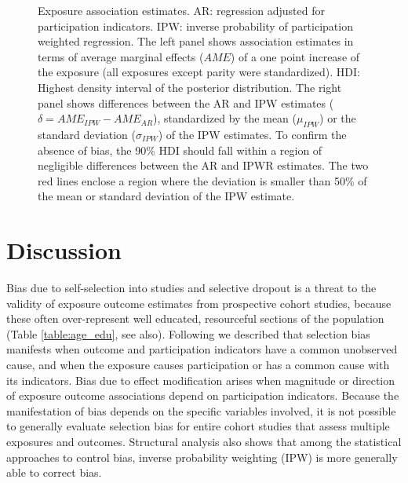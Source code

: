\documentclass[]{article}
\begin{document}
\begin{figure}
	\centering
	
	\caption{\footnotesize \linespread{1.3}\selectfont{} Exposure association estimates. AR: regression adjusted for participation indicators. IPW: inverse probability of participation weighted regression. The left panel shows association estimates in terms of average marginal effects ($AME$) of a one point increase of the exposure (all exposures except parity were standardized). HDI: Highest density interval of the posterior distribution. The right panel shows differences between the AR and IPW estimates ($\delta = AME_{IPW}-AME_{AR}$), standardized by the mean ($\mu_{IPW}$) or the standard deviation ($\sigma_{IPW}$) of the IPW estimates. To confirm the absence of bias, the 90\% HDI should fall within a region of negligible differences between the AR and IPWR estimates. The two red lines enclose a region where the deviation is smaller than 50\% of the mean or standard deviation of the IPW estimate.}
	\label{fig:estimates}
\end{figure}




\section{Discussion}
Bias due to self-selection into studies and selective dropout is a threat to the validity of exposure outcome estimates from prospective cohort studies, because these often over-represent well educated, resourceful sections of the population (Table \ref{table:age_edu}, see also\supercite{Vinther-Larsen2010-hq, Galea2007-hv, Howe2013-vv}). Following \citeauthor{Hernan2004-oz}\supercite{Hernan2004-oz} we described that selection bias manifests when outcome and participation indicators have a common unobserved cause, and when the exposure causes participation or has a common cause with its indicators. Bias due to effect modification \supercite{Greenland1989-kd, VanderWeele2009-lm} arises when magnitude or direction of exposure outcome associations depend on participation indicators. Because the manifestation of bias depends on the specific variables involved, it is not possible to generally evaluate selection bias for entire cohort studies that assess multiple exposures and outcomes. Structural analysis also shows that among the statistical approaches to control bias, inverse probability weighting (IPW) is more generally able to correct bias\supercite{Hernan2004-oz}.
\end{document}
